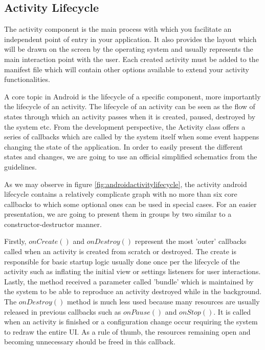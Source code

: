 \subsection*{Activity Lifecycle}

The activity component is the main process with which you facilitate an independent point of entry in your application. It also provides the layout which will be drawn on the screen by the operating system and usually represents the main interaction point with the user. Each created activity must be added to the manifest file which will contain other options available to extend your activity functionalities.

A core topic in Android is the lifecycle of a specific component, more importantly the lifecycle of an activity. The lifecycle of an activity can be seen as the flow of states through which an activity passes when it is created, paused, destroyed by the system etc. From the development perspective, the Activity class offers a series of callbacks which are called by the system itself when some event happens changing the state of the application. In order to easily present the different states and changes, we are going to use an official simplified schematics from the guidelines.

As we may observe in figure \ref{fig:androidactivitylifecycle}, the activity android lifecycle contains a relatively complicate graph with no more than six core callbacks to which some optional ones can be used in special cases. For an easier presentation, we are going to present them in groups by two similar to a constructor-destructor manner.

Firstly, $onCreate()$ and $onDestroy()$ represent the most 'outer' callbacks called when an activity is created from scratch or destroyed. The create is responsible for basic startup logic usually done once per the lifecycle of the activity such as inflating the initial view or settings listeners for user interactions. Lastly, the method received a parameter called 'bundle' which is maintained by the system to be able to reproduce an activity destroyed while in the background. The $onDestroy()$ method is much less used because many resources are usually released in previous callbacks such as $onPause()$ and $onStop()$. It is called when an activity is finished or a configuration change occur requiring the system to redraw the entire UI. As a rule of thumb, the resources remaining open and becoming unnecessary should be freed in this callback.

